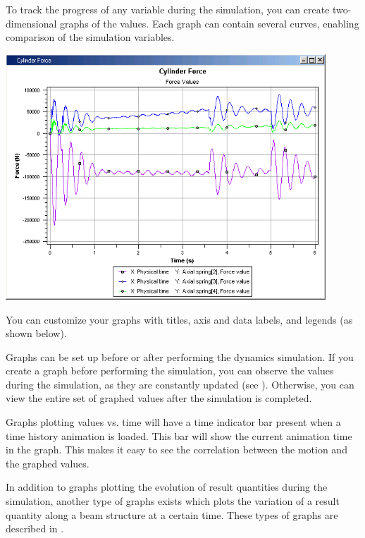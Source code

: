 
To track the progress of any variable during the simulation, you can create
two-dimensional graphs of the values. Each graph can contain several curves,
enabling comparison of the simulation variables.

\begin{center}
  \includegraphics[width=0.9\textwidth]{Figures/Graph-view}
\end{center}

You can customize your graphs with titles, axis and data labels, and legends
(as shown below).

Graphs can be set up before or after performing the dynamics simulation.
If you create a graph before performing the simulation, you can observe
the values during the simulation, as they are constantly updated
(see ).
Otherwise, you can view the entire set of graphed values after the simulation
is completed.

Graphs plotting values vs. time will have a time indicator bar present when
a time history animation is loaded. This bar will show the current animation
time in the graph. This makes it easy to see the correlation between the motion
and the graphed values.

In addition to graphs plotting the evolution of result quantities during the
simulation, another type of graphs exists which plots the variation of a result
quantity along a beam structure at a certain time. These types of graphs
are described in .


